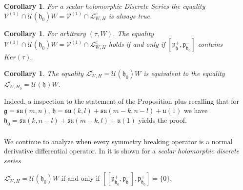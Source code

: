\documentclass[12pt]{amsart}
\newtheorem{cor}[thm]{Corollary}
\theoremstyle{definition}
\theoremstyle{remark}
\newcommand{\g}{\mathfrak{g}}
\newcommand{\h}{\mathfrak{h}}
\newcommand{\p}{\mathfrak p}
\numberwithin{equation}{section}
\begin{document}
\begin{cor} For a scalar holomorphic Discrete Series
 the equality $ \mathcal V^{(1)}\cap \mathcal U(\h_0)W =   \mathcal V^{(1)}\cap \mathcal L_{W,H}^c$
is always true.
\end{cor}
\begin{cor}For arbitrary $(\tau, W)$. The equality $ \mathcal V^{(1)}\cap \mathcal U(\h_0)W =
   \mathcal V^{(1)}\cap \mathcal L_{W,H}^c$ holds if and only if $[\p_\h^+,\p_{\h_0}^-]$ contains
$Ker(\tau)$.
\end{cor}
\begin{cor}The equality $\mathcal L_{W,H}^c  =   \mathcal U(\h_0)W  $ is {\em equivalent}
to the equality $\mathcal L_{W,H_0}^c  =   \mathcal U(\h)W  $.
\end{cor}

 Indeed, a inspection to the statement of the Proposition plus recalling that for $\g=\mathfrak{su}(m,n)$, $\h=\mathfrak{su}(k,l)+\mathfrak{su}(m-k,n-l)+\mathfrak u(1)$   we have $\h_0=\mathfrak{su}(k,n-l)+\mathfrak{su}(m-k,l)+\mathfrak u(1)$
yields the proof.

\smallskip


  \subsubsection{ } We continue to analyze when every symmetry breaking operator is a normal derivative differential operator.  In \cite[Proposition 3]{Va} it is shown for a {\it scalar holomorphic discrete series}

 \phantom{xxxxxxxxx}$\mathcal L_{W,H}^c =\mathcal U(\h_0)W$ if and only if $[[\p_{\h_0}^+, \p_{\h}^-],\p_{\h_0}^+]=\{0\}$.
\end{document}
